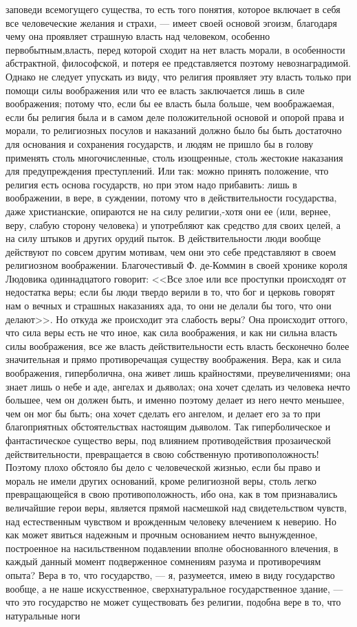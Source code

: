 \documentclass[12pt]{article}
\begin{document}
заповеди всемогущего существа, то есть того понятия, которое включает в себя все человеческие желания и страхи, --- имеет своей основой эгоизм, благодаря чему она проявляет страшную власть над человеком, особенно первобытным,власть, перед которой сходит на нет власть морали, в особенности абстрактной, философской, и потеря ее представляется поэтому невознаградимой. Однако не следует упускать из виду, что религия проявляет эту власть только при помощи силы воображения или что ее власть заключается лишь в силе воображения; потому что, если бы ее власть была больше, чем воображаемая, если бы религия была и в самом деле положительной основой и опорой права и морали, то религиозных посулов и наказаний должно было бы быть достаточно для основания и сохранения государств, и людям не пришло бы в голову применять столь многочисленные, столь изощренные, столь жестокие наказания для предупреждения преступлений. Или так: можно принять положение, что религия есть основа государств, но при этом надо прибавить: лишь в воображении, в вере, в суждении, потому что в действительности государства, даже христианские, опираются не на силу религии,-хотя они ее (или, вернее, веру, слабую сторону человека) и употребляют как средство для своих целей, а на силу штыков и других орудий пыток. В действительности люди вообще действуют по совсем другим мотивам, чем они это себе представляют в своем религиозном воображении. Благочестивый Ф. де-Коммин в своей хронике короля Людовика одиннадцатого говорит: <<Все злое или все проступки происходят от недостатка веры; если бы люди твердо верили в то, что бог и церковь говорят нам о вечных и страшных наказаниях ада, то они не делали бы того, что они делают>>. Но откуда же происходит эта слабость веры? Она происходит оттого, что сила веры есть не что иное, как сила воображения, и как ни сильна власть силы воображения, все же власть действительности есть власть бесконечно более значительная и прямо противоречащая существу воображения. Вера, как и сила воображения, гиперболична, она живет лишь крайностями, преувеличениями; она знает лишь о небе и аде, ангелах и дьяволах; она хочет сделать из человека нечто большее, чем он должен быть, и именно поэтому делает из него нечто меньшее, чем он мог бы быть; она хочет сделать его ангелом, и делает его за то при благоприятных обстоятельствах настоящим дьяволом. Так гиперболическое и фантастическое существо веры, под влиянием противодействия прозаической действительности, превращается в свою собственную противоположность! Поэтому плохо обстояло бы дело с человеческой жизнью, если бы право и мораль не имели других оснований, кроме религиозной веры, столь легко превращающейся в свою противоположность, ибо она, как в том признавались величайшие герои веры, является прямой насмешкой над свидетельством чувств, над естественным чувством и врожденным человеку влечением к неверию. Но как может явиться надежным и прочным основанием нечто вынужденное, построенное на насильственном подавлении вполне обоснованного влечения, в каждый данный момент подверженное сомнениям разума и противоречиям опыта? Вера в то, что государство, --- я, разумеется, имею в виду государство вообще, а не наше искусственное, сверхнатуральное государственное здание, --- что это государство не может существовать без религии, подобна вере в то, что натуральные ноги 
\end{document}
